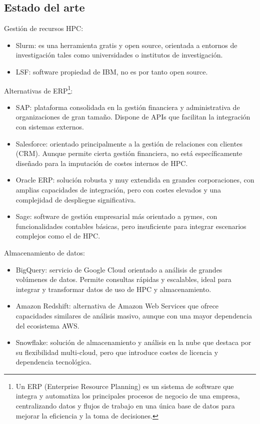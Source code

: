 \subsection{Estado del arte}
Gestión de recursos HPC:
\begin{itemize}
    \item Slurm: es una herramienta gratis y open source, orientada a entornos de investigación tales como universidades o institutos de investigación.
    \item LSF: software propiedad de IBM, no es por tanto open source.
\end{itemize}

Alternativas de ERP\footnote{Un ERP (Enterprise Resource Planning) es un sistema de software que integra y automatiza 
los principales procesos de negocio de una empresa, centralizando datos y flujos de trabajo en una única base de datos 
para mejorar la eficiencia y la toma de decisiones.}:
\begin{itemize}
    \item SAP: plataforma consolidada en la gestión financiera y administrativa de organizaciones de gran tamaño. Dispone de APIs que facilitan la integración con sistemas externos.
    \item Salesforce: orientado principalmente a la gestión de relaciones con clientes (CRM). Aunque permite cierta gestión financiera, no está específicamente diseñado para la imputación de costes internos de HPC.
    \item Oracle ERP\cite{ComoPuedesDotar}: solución robusta y muy extendida en grandes corporaciones, con amplias capacidades de integración, pero con costes elevados y una complejidad de despliegue significativa.
    \item Sage: software de gestión empresarial más orientado a pymes, con funcionalidades contables básicas, pero insuficiente para integrar escenarios complejos como el de HPC.

\end{itemize}

Almacenamiento de datos:
\begin{itemize}
    \item BigQuery: servicio de Google Cloud orientado a análisis de grandes volúmenes de datos. Permite consultas rápidas y escalables, ideal para integrar y transformar datos de uso de HPC y almacenamiento.
    \item Amazon Redshift: alternativa de Amazon Web Services que ofrece capacidades similares de análisis masivo, aunque con una mayor dependencia del ecosistema AWS.
    \item Snowflake: solución de almacenamiento y análisis en la nube que destaca por su flexibilidad multi-cloud, pero que introduce costes de licencia y dependencia tecnológica.

\end{itemize}